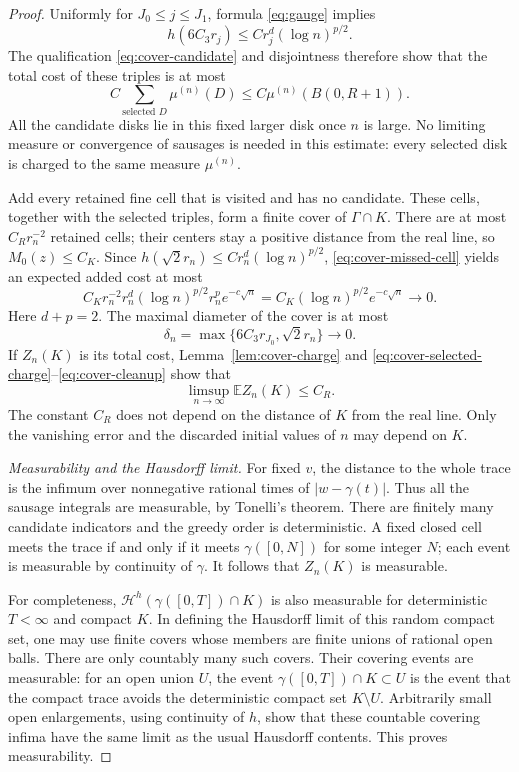 \begin{proof}
Uniformly for \(J_0\le j\le J_1\), formula
\eqref{eq:gauge} implies
\[
 h(6C_3r_j)\le C r_j^d(\log n)^{p/2}.
\]
The qualification \eqref{eq:cover-candidate} and disjointness
therefore show that the total cost of these triples is at most
\begin{equation}
 C\sum_{\text{selected }D}\mu^{(n)}(D)
       \le C\mu^{(n)}(B(0,R+1)).
 \label{eq:cover-selected-charge}
\end{equation}
All the candidate disks lie in this fixed larger disk once
\(n\) is large.  No limiting measure or convergence of sausages
is needed in this estimate: every selected disk is charged to
the same measure \(\mu^{(n)}\).

Add every retained fine cell that is visited and has no candidate.
These cells, together with the selected triples, form a finite
cover of \(\Gamma\cap K\).  There are at most \(C_Rr_n^{-2}\)
retained cells; their centers stay a positive distance from the
real line, so \(M_0(z)\le C_K\).  Since
\(h(\sqrt2r_n)\le Cr_n^d(\log n)^{p/2}\),
\eqref{eq:cover-missed-cell} yields an expected added cost at most
\begin{equation}
 C_Kr_n^{-2}r_n^d(\log n)^{p/2}r_n^p e^{-c\sqrt n}
   =C_K(\log n)^{p/2}e^{-c\sqrt n}\longrightarrow0.
 \label{eq:cover-cleanup}
\end{equation}
Here \(d+p=2\).  The maximal diameter of the cover is at most
\[
 \delta_n=\max\{6C_3r_{J_0},\sqrt2r_n\}\longrightarrow0.
\]
If \(Z_n(K)\) is its total cost, Lemma~\ref{lem:cover-charge}
and \eqref{eq:cover-selected-charge}--\eqref{eq:cover-cleanup}
show that
\begin{equation}
 \limsup_{n\to\infty}\mathbb E Z_n(K)\le C_R.
 \label{eq:cover-cost-expectation}
\end{equation}
The constant \(C_R\) does not depend on the distance of \(K\)
from the real line.  Only the vanishing error and the discarded
initial values of \(n\) may depend on \(K\).

\emph{Measurability and the Hausdorff limit.}
For fixed \(v\), the distance to the whole trace is the infimum
over nonnegative rational times of \(|w-\gamma(t)|\).  Thus all
the sausage integrals are measurable, by Tonelli's theorem.
There are finitely many candidate indicators and the greedy
order is deterministic.  A fixed closed cell meets the trace
if and only if it meets \(\gamma([0,N])\) for some integer
\(N\); each event is measurable by continuity of \(\gamma\).
It follows that \(Z_n(K)\) is measurable.

For completeness, \(\mathcal H^h(\gamma([0,T])\cap K)\) is
also measurable for deterministic \(T<\infty\) and compact
\(K\).  In defining the Hausdorff limit of this random compact
set, one may use finite covers whose members are finite unions
of rational open balls.  There are only countably many such
covers.  Their covering events are measurable: for an open
union \(U\), the event
\(\gamma([0,T])\cap K\subset U\) is the event that the compact
trace avoids the deterministic compact set \(K\setminus U\).
Arbitrarily small open enlargements, using continuity of \(h\),
show that these countable covering infima have the same limit
as the usual Hausdorff contents.  This proves measurability.


\end{proof}
